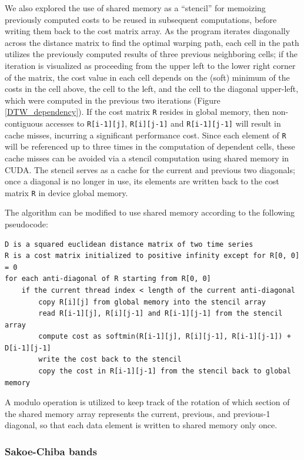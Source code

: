 \documentclass[12pt, letterpaper]{article}
\begin{document}
We also explored the use of shared memory as a ``stencil'' for memoizing
previously computed costs to be reused in subsequent computations, before
writing them back to the cost matrix array. As the program iterates diagonally
across the distance matrix to find the optimal warping path, each cell in the
path utilizes the previously computed results of three previous neighboring
cells; if the iteration is visualized as proceeding from the upper left to the
lower right corner of the matrix, the cost value in each cell depends on the
(soft) minimum of the costs in the cell above, the cell to the left, and the
cell to the diagonal upper-left, which were computed in the previous two
iterations (Figure \ref{DTW_dependency}). If the cost matrix \verb|R| resides in
global memory, then non-contiguous accesses to \verb|R[i-1][j]|,
\verb|R[i][j-1]| and \verb|R[i-1][j-1]| will result in cache misses, incurring a
significant performance cost. Since each element of \verb|R| will be referenced
up to three times in the computation of dependent cells, these cache misses can
be avoided via a stencil computation using shared memory in CUDA. The stencil
serves as a cache for the current and previous two diagonals; once a diagonal is
no longer in use, its elements are written back to the cost matrix \verb|R| in
device global memory.

\FloatBarrier The algorithm can be modified to use shared memory according to
the following pseudocode:

\begin{verbatim}
D is a squared euclidean distance matrix of two time series
R is a cost matrix initialized to positive infinity except for R[0, 0] = 0
for each anti-diagonal of R starting from R[0, 0]
    if the current thread index < length of the current anti-diagonal
        copy R[i][j] from global memory into the stencil array
        read R[i-1][j], R[i][j-1] and R[i-1][j-1] from the stencil array
        compute cost as softmin(R[i-1][j], R[i][j-1], R[i-1][j-1]) + D[i-1][j-1]
        write the cost back to the stencil
        copy the cost in R[i-1][j-1] from the stencil back to global memory
\end{verbatim}

A modulo operation is utilized to keep track of the rotation of which section
of the shared memory array represents the current, previous, and previous-1
diagonal, so that each data element is written to shared memory only once.

\FloatBarrier

\subsubsection{Sakoe-Chiba bands}
\end{document}
